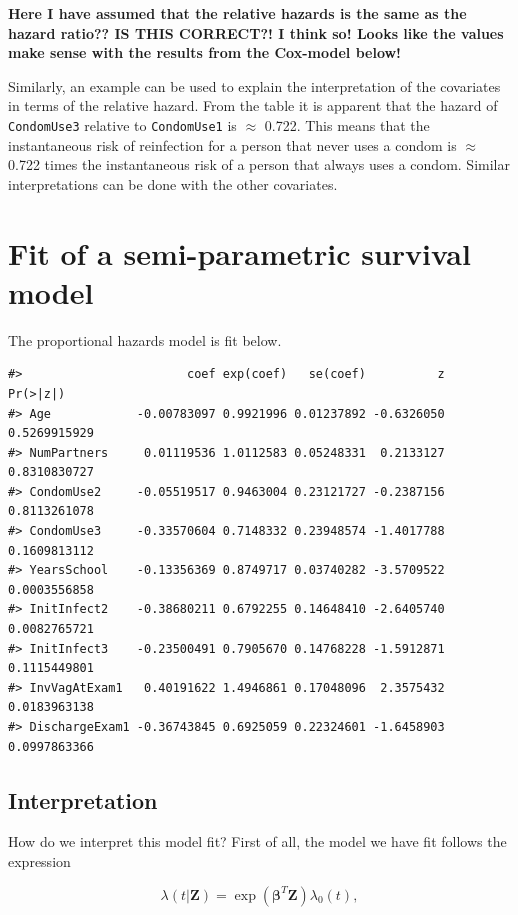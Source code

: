 \documentclass[
]{article}
\begin{document}
\textbf{Here I have assumed that the relative hazards is the same as the hazard ratio?? IS THIS CORRECT?! I think so! Looks like the values make sense with the results from the Cox-model below!}

Similarly, an example can be used to explain the interpretation of the covariates in terms of the relative hazard. From the table it is apparent that the hazard of \texttt{CondomUse3} relative to \texttt{CondomUse1} is \(\approx\) 0.722. This means that the instantaneous risk of reinfection for a person that never uses a condom is \(\approx\) 0.722 times the instantaneous risk of a person that always uses a condom. Similar interpretations can be done with the other covariates.

\hypertarget{fit-of-a-semi-parametric-survival-model}{%
\section{Fit of a semi-parametric survival model}\label{fit-of-a-semi-parametric-survival-model}}

The proportional hazards model is fit below.

\begin{verbatim}
#>                       coef exp(coef)   se(coef)          z     Pr(>|z|)
#> Age            -0.00783097 0.9921996 0.01237892 -0.6326050 0.5269915929
#> NumPartners     0.01119536 1.0112583 0.05248331  0.2133127 0.8310830727
#> CondomUse2     -0.05519517 0.9463004 0.23121727 -0.2387156 0.8113261078
#> CondomUse3     -0.33570604 0.7148332 0.23948574 -1.4017788 0.1609813112
#> YearsSchool    -0.13356369 0.8749717 0.03740282 -3.5709522 0.0003556858
#> InitInfect2    -0.38680211 0.6792255 0.14648410 -2.6405740 0.0082765721
#> InitInfect3    -0.23500491 0.7905670 0.14768228 -1.5912871 0.1115449801
#> InvVagAtExam1   0.40191622 1.4946861 0.17048096  2.3575432 0.0183963138
#> DischargeExam1 -0.36743845 0.6925059 0.22324601 -1.6458903 0.0997863366
\end{verbatim}

\hypertarget{interpretation-1}{%
\subsection{Interpretation}\label{interpretation-1}}

How do we interpret this model fit? First of all, the model we have fit follows the expression

\[
\lambda(t|\mathbf{Z}) =  \exp(\mathbf{\beta}^T\mathbf{Z})\lambda_0(t),  
\]
\end{document}
